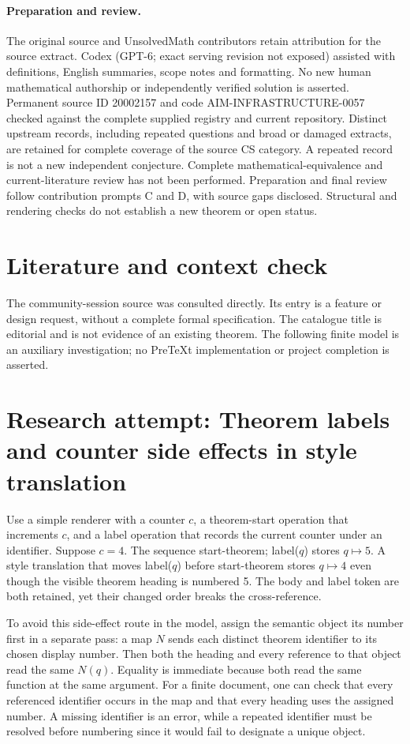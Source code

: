 \documentclass[11pt]{article}
\begin{document}
\paragraph{Preparation and review.}
The original source and UnsolvedMath contributors retain attribution for the source extract. Codex (GPT-6; exact serving revision not exposed) assisted with definitions, English summaries, scope notes and formatting. No new human mathematical authorship or independently verified solution is asserted. Permanent source ID 20002157 and code AIM-INFRASTRUCTURE-0057 checked against the complete supplied registry and current repository. Distinct upstream records, including repeated questions and broad or damaged extracts, are retained for complete coverage of the source CS category. A repeated record is not a new independent conjecture. Complete mathematical-equivalence and current-literature review has not been performed. Preparation and final review follow contribution prompts C and D, with source gaps disclosed. Structural and rendering checks do not establish a new theorem or open status.
\label{end:20002157}

\section{Literature and context check}
The community-session source was consulted directly. Its entry is a feature or design request, without a complete formal specification. The catalogue title is editorial and is not evidence of an existing theorem. The following finite model is an auxiliary investigation; no PreTeXt implementation or project completion is asserted.
\section{Research attempt: Theorem labels and counter side effects in style translation}
Use a simple renderer with a counter $c$, a theorem-start operation that increments $c$, and a label operation that records the current counter under an identifier. Suppose $c=4$. The sequence start-theorem; label($q$) stores $q\mapsto5$. A style translation that moves label($q$) before start-theorem stores $q\mapsto4$ even though the visible theorem heading is numbered 5. The body and label token are both retained, yet their changed order breaks the cross-reference.

To avoid this side-effect route in the model, assign the semantic object its number first in a separate pass: a map $N$ sends each distinct theorem identifier to its chosen display number. Then both the heading and every reference to that object read the same $N(q)$. Equality is immediate because both read the same function at the same argument. For a finite document, one can check that every referenced identifier occurs in the map and that every heading uses the assigned number. A missing identifier is an error, while a repeated identifier must be resolved before numbering since it would fail to designate a unique object.
\end{document}
